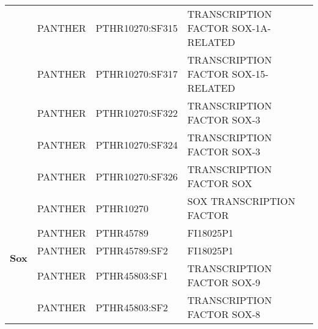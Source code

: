 \documentclass[../main.tex]{subfiles}
\begin{document}
\begin{landscape}
\begin{longtable}{@{}cllll@{}}
		                                & PANTHER              & PTHR10270:SF315 & TRANSCRIPTION FACTOR SOX-1A-RELATED                                                                                                          & \\
		                                & PANTHER              & PTHR10270:SF317 & TRANSCRIPTION FACTOR SOX-15-RELATED                                                                                                          & \\
		                                & PANTHER              & PTHR10270:SF322 & TRANSCRIPTION FACTOR SOX-3                                                                                                                   & \\
		                                & PANTHER              & PTHR10270:SF324 & TRANSCRIPTION FACTOR SOX-3                                                                                                                   & \\
		                                & PANTHER              & PTHR10270:SF326 & TRANSCRIPTION FACTOR SOX                                                                                                                     & \\
		\multirow{9}{*}{\textbf{Sox}}   & PANTHER              & PTHR10270       & SOX TRANSCRIPTION FACTOR                                                                                                                     & \\
		                                & PANTHER              & PTHR45789       & FI18025P1                                                                                                                                    & \\
		                                & PANTHER              & PTHR45789:SF2   & FI18025P1                                                                                                                                    & \\
		                                & PANTHER              & PTHR45803:SF1   & TRANSCRIPTION FACTOR SOX-9                                                                                                                   & \\
		                                & PANTHER              & PTHR45803:SF2   & TRANSCRIPTION FACTOR SOX-8                                                                                                                   & \\

\end{longtable}
\end{landscape}
\end{document}
